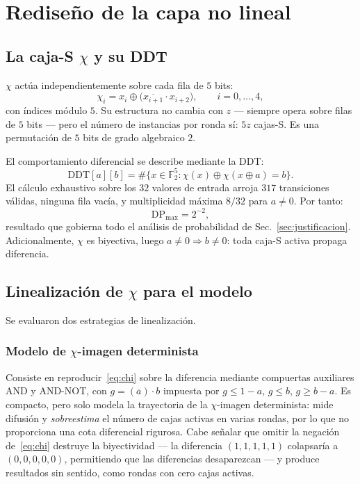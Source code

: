\documentclass[conference]{IEEEtran}
\newcommand{\Fdos}{\mathbb{F}_2}
\newcommand{\xor}{\oplus}
\begin{document}
\section{Rediseño de la capa no lineal}\label{sec:nolineal}

\subsection{La caja-S $\chi$ y su DDT}

$\chi$ actúa independientemente sobre cada fila de $5$ bits:
\begin{equation}\label{eq:chi}
\chi_i = x_i \xor \bigl(\overline{x_{i+1}}\cdot x_{i+2}\bigr),\qquad i=0,\dots,4,
\end{equation}
con índices módulo $5$. Su estructura no cambia con $z$ --- siempre opera sobre filas de
$5$ bits --- pero el número de instancias por ronda sí: $5z$ cajas-S. Es una permutación
de $5$ bits de grado algebraico $2$.

El comportamiento diferencial se describe mediante la DDT:
\begin{equation}
\mathrm{DDT}[a][b]=\#\bigl\{x\in\Fdos^5 : \chi(x)\xor\chi(x\xor a)=b\bigr\}.
\end{equation}
El cálculo exhaustivo sobre los $32$ valores de entrada arroja $317$ transiciones
válidas, ninguna fila vacía, y multiplicidad máxima $8/32$ para $a\neq0$. Por tanto:
\begin{equation}\label{eq:dpmax}
\mathrm{DP}_{\max}=2^{-2},
\end{equation}
resultado que gobierna todo el análisis de probabilidad de Sec.~\ref{sec:justificacion}.
Adicionalmente, $\chi$ es biyectiva, luego $a\neq0\Rightarrow b\neq0$: toda caja-S
activa propaga diferencia.

\subsection{Linealización de $\chi$ para el modelo}

Se evaluaron dos estrategias de linealización.

\subsubsection{Modelo de $\chi$-imagen determinista}
Consiste en reproducir~\eqref{eq:chi} sobre la diferencia mediante compuertas auxiliares
AND y AND-NOT, con $g=(\overline{a})\cdot b$ impuesta por $g\le 1-a$, $g\le b$,
$g\ge b-a$. Es compacto, pero solo modela la trayectoria de la $\chi$-imagen
determinista: mide difusión y \emph{sobreestima} el número de cajas activas en varias
rondas, por lo que no proporciona una cota diferencial rigurosa. Cabe señalar que omitir
la negación de~\eqref{eq:chi} destruye la biyectividad --- la diferencia $(1,1,1,1,1)$
colapsaría a $(0,0,0,0,0)$, permitiendo que las diferencias desaparezcan --- y produce
resultados sin sentido, como rondas con cero cajas activas.
\end{document}
